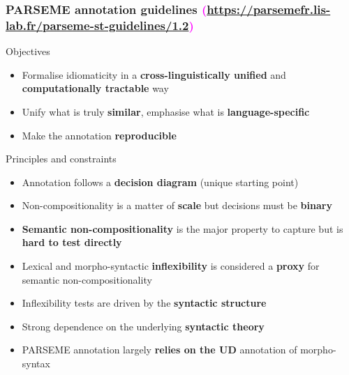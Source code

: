 \documentclass[xcolor=dvipsnames]{beamer}
\begin{document}
\begin{frame}
\begin{frame}
\end{frame}

\begin{frame}
  \frametitle{PARSEME annotation guidelines \textcolor{magenta}{{\scriptsize (\url{https://parsemefr.lis-lab.fr/parseme-st-guidelines/1.2})}}}

\begin{scriptsize}

\vspace{-0.2cm}

\begin{block}{Objectives} 
\begin{itemize}
\item Formalise idiomaticity in a \textbf{cross-linguistically unified} and \textbf{computationally tractable} way
\item Unify what is truly \textbf{similar}, emphasise what is \textbf{language-specific}
\item Make the annotation \textbf{reproducible}
\end{itemize}
\end{block}

\vspace{-0.2cm}

\begin{block}{Principles and constraints} 
\begin{itemize}
\item Annotation follows a \textbf{decision diagram} (unique starting point)
\item Non-compositionality is a matter of \textbf{scale} but decisions must be \textbf{binary}
\item \textbf{Semantic non-compositionality} is the major property to capture but is \textbf{hard to test directly}
\item Lexical and morpho-syntactic \textbf{inflexibility} is considered a \textbf{proxy} for semantic non-compositionality
\item Inflexibility tests are driven by the \textbf{syntactic structure}
\item Strong dependence on the underlying \textbf{syntactic theory}
\item PARSEME annotation largely \textbf{relies on the UD} annotation of morpho-syntax
\end{itemize}
\end{block}

\end{scriptsize}

\end{frame}




\end{frame}
\end{document}

